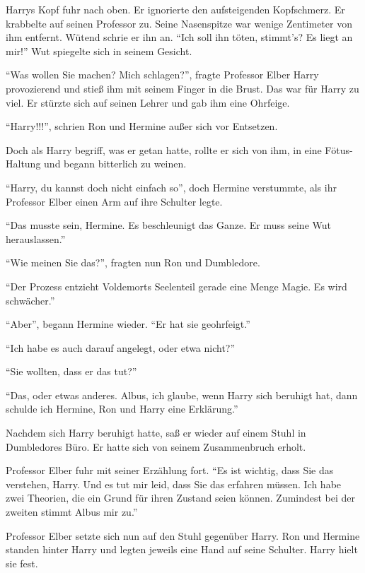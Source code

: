 Harrys Kopf fuhr nach oben. Er ignorierte den aufsteigenden Kopfschmerz. Er krabbelte auf seinen Professor zu. Seine Nasenspitze war wenige Zentimeter von ihm entfernt. Wütend schrie er ihn an. \enquote{Ich soll ihn töten, stimmt’s? Es liegt an mir!} Wut spiegelte sich in seinem Gesicht.

\enquote{Was wollen Sie machen? Mich schlagen?}, fragte Professor Elber Harry provozierend und stieß ihm mit seinem Finger in die Brust. Das war für Harry zu viel. Er stürzte sich auf seinen Lehrer und gab ihm eine Ohrfeige.

\enquote{Harry!!!}, schrien Ron und Hermine außer sich vor Entsetzen.

Doch als Harry begriff, was er getan hatte, rollte er sich von ihm, in eine Fötus-Haltung und begann bitterlich zu weinen.

\enquote{Harry, du kannst doch nicht einfach so\abs}, doch Hermine verstummte, als ihr Professor Elber einen Arm auf ihre Schulter legte.

\enquote{Das musste sein, Hermine. Es beschleunigt das Ganze. Er muss seine Wut herauslassen.}

\enquote{Wie meinen Sie das?}, fragten nun Ron und Dumbledore.

\enquote{Der Prozess entzieht Voldemorts Seelenteil gerade eine Menge Magie. Es wird schwächer.}

\enquote{Aber}, begann Hermine wieder. \enquote{Er hat sie geohrfeigt.}

\enquote{Ich habe es auch darauf angelegt, oder etwa nicht?}

\enquote{Sie wollten, dass er das tut?}

\enquote{Das, oder etwas anderes. \gst Albus, ich glaube, wenn Harry sich beruhigt hat, dann schulde ich Hermine, Ron und Harry eine Erklärung.}

Nachdem sich Harry beruhigt hatte, saß er wieder auf einem Stuhl in Dumbledores Büro. Er hatte sich von seinem Zusammenbruch erholt.

Professor Elber fuhr mit seiner Erzählung fort. \enquote{Es ist wichtig, dass Sie das verstehen, Harry. Und es tut mir leid, dass Sie das erfahren müssen. Ich habe zwei Theorien, die ein Grund für ihren Zustand seien können. Zumindest bei der zweiten stimmt Albus mir zu.}

Professor Elber setzte sich nun auf den Stuhl gegenüber Harry. Ron und Hermine standen hinter Harry und legten jeweils eine Hand auf seine Schulter. Harry hielt sie fest.

